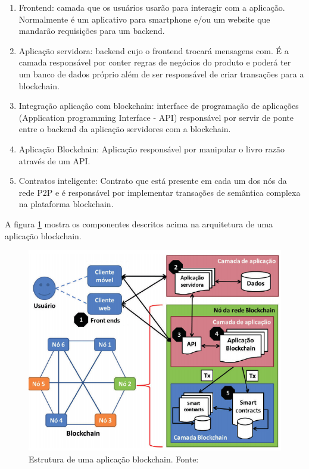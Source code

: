 \documentclass[12pt]{article}
\begin{document}
\begin{enumerate}
    \item Frontend: camada que os usuários usarão para interagir com a aplicação. Normalmente é um aplicativo para smartphone e/ou um website que mandarão requisições para um backend.
    \item Aplicação servidora: backend cujo o frontend trocará mensagens com. É a camada responsável por conter regras de negócios do produto e poderá ter um banco de dados próprio além de ser responsável de criar transações para a blockchain.
    \item Integração aplicação com blockchain: interface de programação de aplicações (Application programming
Interface - API) responsável por servir de ponte entre o backend da aplicação servidores com a blockchain.
    \item Aplicação Blockchain: Aplicação responsável por manipular o livro razão através de um API.
    \item Contratos inteligente: Contrato que está presente em cada um dos nós da rede P2P e é responsável por implementar transações de semântica complexa na plataforma blockchain. 
\end{enumerate}

A figura \ref{fig:aplicacao_blockchain} mostra os componentes descritos acima na arquitetura de uma aplicação blockchain.

\begin{figure}[H]
    \centering
    \includegraphics[scale=0.7]{Imagens/estrutura_dapp.png}
    \caption{Estrutura de uma aplicação blockchain. Fonte: \cite{braga2017segurancca}}
    \label{fig:aplicacao_blockchain}
\end{figure}
\end{document}
